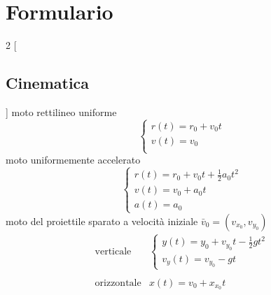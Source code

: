 \documentclass[10pt, letterpaper]{report}
\begin{document}
\chapter{Formulario}
\setlength{\columnsep}{1cm}
\begin{multicols*}{2}
    [
    \section{Cinematica}
    ]
    moto rettilineo uniforme 
    $$ \begin{cases}
        r(t)=r_0+v_0t\\ 
        v(t)=v_0\\ 
    \end{cases}$$
    moto uniformemente accelerato
    $$ \begin{cases}
        r(t)=r_0+v_0t+\frac{1}{2}a_0t^2\\ 
        v(t)=v_0+a_0t\\
        a(t)=a_0 
    \end{cases}$$
    moto del proiettile sparato a velocità iniziale $\bar v_0=(v_{x_0},v_{y_0})$ 
    $$\begin{matrix}
        \text{verticale} &  \begin{cases}
            y(t)=y_0+v_{y_0}t-\frac{1}{2}gt^2\\ 
            v_y(t)=v_{y_0}-gt
        \end{cases}\\ \\
        \text{orizzontale} & x(t)=v_0+x_{x_0}t
    \end{matrix}$$








    \end{multicols*}
\end{document}
